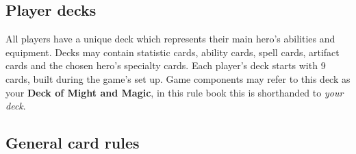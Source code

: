 \subsection*{\hypertarget{Playerdecks}{Player decks}}
All players have a unique deck which represents their main hero's abilities and equipment. Decks may contain statistic cards, ability cards, spell cards, artifact cards and the chosen hero’s specialty cards. Each player’s deck starts with 9 cards, built during the game’s set up. Game components may refer to this deck as your \textbf{Deck of Might and Magic}, in this rule book this is shorthanded to \textit{your deck}.
\subsection*{General card rules}
